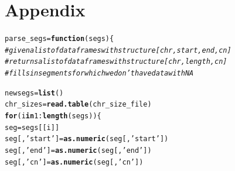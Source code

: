 \documentclass[12pt]{article}\usepackage[]{graphicx}\usepackage[]{color}
\makeatletter
\newcommand{\hlnum}[1]{\textcolor[rgb]{0.686,0.059,0.569}{#1}}%
\newcommand{\hlstr}[1]{\textcolor[rgb]{0.192,0.494,0.8}{#1}}%
\newcommand{\hlcom}[1]{\textcolor[rgb]{0.678,0.584,0.686}{\textit{#1}}}%
\newcommand{\hlopt}[1]{\textcolor[rgb]{0,0,0}{#1}}%
\newcommand{\hlstd}[1]{\textcolor[rgb]{0.345,0.345,0.345}{#1}}%
\newcommand{\hlkwa}[1]{\textcolor[rgb]{0.161,0.373,0.58}{\textbf{#1}}}%
\newcommand{\hlkwb}[1]{\textcolor[rgb]{0.69,0.353,0.396}{#1}}%
\newcommand{\hlkwc}[1]{\textcolor[rgb]{0.333,0.667,0.333}{#1}}%
\newcommand{\hlkwd}[1]{\textcolor[rgb]{0.737,0.353,0.396}{\textbf{#1}}}%
\newenvironment{kframe}{%
 \def\at@end@of@kframe{}%
 \ifinner\ifhmode%
  \def\at@end@of@kframe{\end{minipage}}%
  \begin{minipage}{\columnwidth}%
 \fi\fi%
 \def\FrameCommand##1{\hskip\@totalleftmargin \hskip-\fboxsep
 \colorbox{shadecolor}{##1}\hskip-\fboxsep
     \hskip-\linewidth \hskip-\@totalleftmargin \hskip\columnwidth}%
 \MakeFramed {\advance\hsize-\width
   \@totalleftmargin\z@ \linewidth\hsize
   \@setminipage}}%
 {\par\unskip\endMakeFramed%
 \at@end@of@kframe}
\newenvironment{knitrout}{}{} %
\makeatother
\begin{document}
\newpage
\newpage
\newpage\newpage

\section*{Appendix}

\begin{knitrout}
\color{fgcolor}\begin{kframe}
\begin{alltt}
\hlstd{parse_segs} \hlkwb{=} \hlkwa{function}\hlstd{(}\hlkwc{segs}\hlstd{)\{}
  \hlcom{#given a list of dataframes with structure [chr, start, end, cn]}
  \hlcom{#returns a list of dataframes with structure [chr, length, cn]}
  \hlcom{#fills in segments for which we don't have data with NA}

  \hlstd{newsegs} \hlkwb{=} \hlkwd{list}\hlstd{()}
  \hlstd{chr_sizes} \hlkwb{=} \hlkwd{read.table}\hlstd{(chr_size_file)}
  \hlkwa{for} \hlstd{(i} \hlkwa{in} \hlnum{1}\hlopt{:}\hlkwd{length}\hlstd{(segs))\{}
    \hlstd{seg} \hlkwb{=} \hlstd{segs[[i]]}
    \hlstd{seg[,}\hlstr{'start'}\hlstd{]} \hlkwb{=} \hlkwd{as.numeric}\hlstd{(seg[,}\hlstr{'start'}\hlstd{])}
    \hlstd{seg[,}\hlstr{'end'}\hlstd{]} \hlkwb{=} \hlkwd{as.numeric}\hlstd{(seg[,}\hlstr{'end'}\hlstd{])}
    \hlstd{seg[,}\hlstr{'cn'}\hlstd{]} \hlkwb{=} \hlkwd{as.numeric}\hlstd{(seg[,}\hlstr{'cn'}\hlstd{])}


\end{alltt}
\end{kframe}
\end{knitrout}
\end{document}

